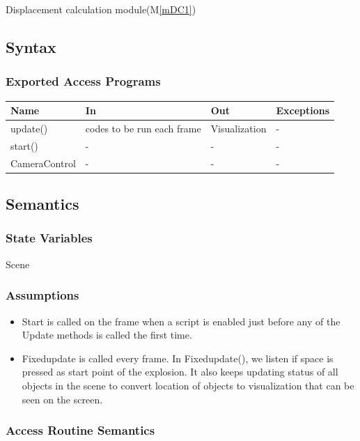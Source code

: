 \documentclass[12pt, titlepage]{article}
\newcommand{\mref}[1]{M\ref{#1}}
\begin{document}
Displacement calculation module(\mref{mDC1})

\subsection{Syntax}

\subsubsection{Exported Access Programs}

\begin{center}
	\begin{tabular}{p{3cm} p{5cm} p{4cm} p{2cm}}
		\hline
		\textbf{Name} & \textbf{In} & \textbf{Out} & \textbf{Exceptions} \\
		\hline
		update() & codes to be run each frame & Visualization & - \\
		start() & - & - & - \\
		CameraControl & - & - & - \\
		\hline
	\end{tabular}
\end{center}

\subsection{Semantics}

\subsubsection{State Variables}
Scene
\subsubsection{Assumptions}

\noindent
\begin{itemize}
	\item Start is called on the frame when a script is enabled just before any of the Update methods is called the first time.
	\item Fixedupdate is called every frame. In Fixedupdate(), we listen if space is pressed as start point of the explosion. It also keeps updating status of all objects in the scene to convert location of objects to visualization that can be seen on the screen.
\end{itemize}

\subsubsection{Access Routine Semantics}
\end{document}
